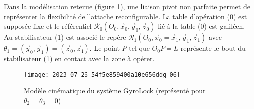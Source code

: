 Dans la modélisation retenue (figure \ref{fig_ccspsi2022:09}), une liaison pivot non parfaite permet de représenter la flexibilité de l'attache reconfigurable. La table d'opération (0) est supposée fixe et le référentiel $\mathcal{R}_{0}\left(O_{0}, \vec{x}_{0}, \vec{y}_{0}, \vec{z}_{0}\right)$ lié à la table (0) est galiléen. Au stabilisateur (1) est associé le repère $\mathcal{R}_{1}\left(O_{0}, \vec{x}_{0}=\vec{x}_{1}, \vec{y}_{1}, \vec{z}_{1}\right)$ avec $\theta_{1}=\left(\vec{y}_{0}, \vec{y}_{1}\right)=\left(\vec{z}_{0}, \vec{z}_{1}\right)$. Le point $P$ tel que $O_{0} P=L$ représente le bout du stabilisateur (1) en contact avec la zone à opérer.

\begin{figure}[!h]
\centering
\texttt{[image: 2023\_07\_26\_54f5e859400a10e656ddg-06]}
\caption{\label{fig_ccspsi2022:09}Modèle cinématique du système GyroLock (représenté pour $\theta_{2}=\theta_{3}=0$)}
\end{figure}

